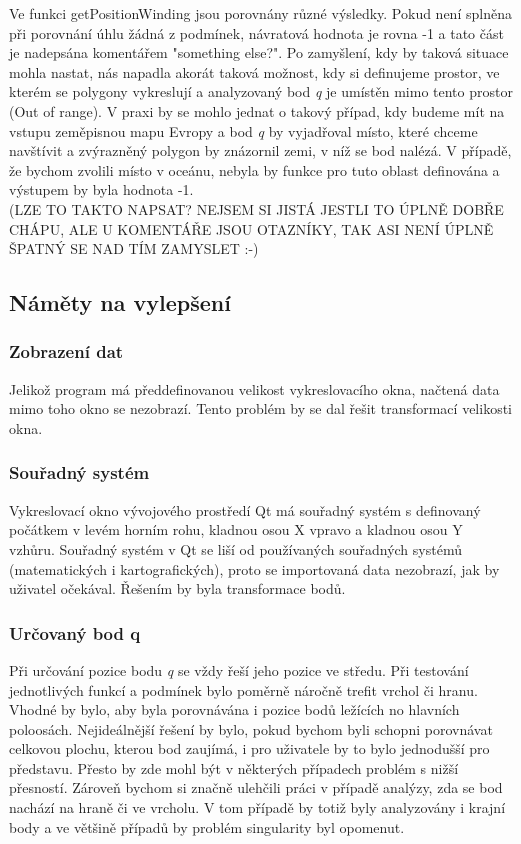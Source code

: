 \documentclass[a4paper, 12pt]{article}
\begin{document}
Ve funkci getPositionWinding jsou porovnány různé výsledky. Pokud není splněna při porovnání úhlu žádná z podmínek, návratová hodnota je rovna -1 a tato část je nadepsána komentářem "something else?". Po zamyšlení, kdy by taková situace mohla nastat, nás napadla akorát taková možnost, kdy si definujeme prostor, ve kterém se polygony vykreslují a analyzovaný bod \textit{q} je umístěn mimo tento prostor (Out of range). V praxi by se mohlo jednat o takový případ, kdy budeme mít na vstupu zeměpisnou mapu Evropy a bod \textit{q} by vyjadřoval místo, které chceme navštívit a zvýrazněný polygon by znázornil zemi, v níž se bod nalézá. V případě, že bychom zvolili místo v oceánu, nebyla by funkce pro tuto oblast definována a výstupem by byla hodnota -1. 
\\
(LZE TO TAKTO NAPSAT? NEJSEM SI JISTÁ JESTLI TO ÚPLNĚ DOBŘE CHÁPU, ALE U KOMENTÁŘE JSOU OTAZNÍKY, TAK ASI NENÍ ÚPLNĚ ŠPATNÝ SE NAD TÍM ZAMYSLET :-) 
\\



\subsection{Náměty na vylepšení}
\subsubsection{Zobrazení dat}
Jelikož program má předdefinovanou velikost vykreslovacího okna, načtená data mimo toho okno se nezobrazí. Tento problém by se dal řešit transformací velikosti okna.

\subsubsection{Souřadný systém}
Vykreslovací okno vývojového prostředí Qt má souřadný systém s definovaný počátkem v levém horním rohu,  kladnou osou X vpravo a kladnou osou Y vzhůru. Souřadný systém v Qt se liší od používaných souřadných systémů (matematických i kartografických), proto se importovaná data nezobrazí, jak by uživatel očekával. Řešením by byla transformace bodů.

\subsubsection{Určovaný bod q}
Při určování pozice bodu \textit{q} se vždy řeší jeho pozice ve středu. Při testování jednotlivých funkcí a podmínek bylo poměrně náročně trefit vrchol či hranu. Vhodné by bylo, aby byla porovnávána i pozice bodů ležících no hlavních poloosách. Nejideálnější řešení by bylo, pokud bychom byli schopni porovnávat celkovou plochu, kterou bod zaujímá, i pro uživatele by to bylo jednodušší pro představu. Přesto by zde mohl být v některých případech problém s nižší přesností. Zároveň bychom si značně ulehčili práci v případě analýzy, zda se bod nachází na hraně či ve vrcholu. V tom případě by totiž byly analyzovány i krajní body a ve většině případů by problém singularity byl opomenut.
\end{document}
